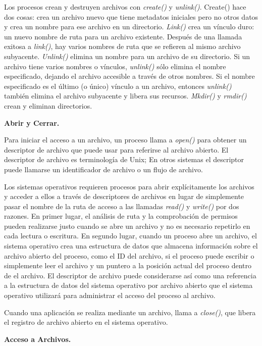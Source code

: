 \documentclass[10pt]{book}
\begin{document}
Los procesos crean y destruyen archivos con \textit{create()} y \textit{unlink()}. Create() hace dos cosas: crea un archivo nuevo que tiene metadatos iniciales pero no otros datos y crea un nombre para ese archivo en un directorio. \textit{Link()} crea un vínculo duro: un nuevo nombre de ruta para un archivo existente. Después de una llamada exitosa a \textit{link()}, hay varios nombres de ruta que se refieren al mismo archivo subyacente. \textit{Unlink()} elimina un nombre para un archivo de su directorio. Si un archivo tiene varios nombres o vínculos, \textit{unlink()} sólo elimina el nombre especificado, dejando el archivo accesible a través de otros nombres. Si el nombre especificado es el último (o único) vínculo a un archivo, entonces \textit{unlink()} también elimina el archivo subyacente y libera sus recursos. \textit{Mkdir()} y \textit{rmdir()} crean y eliminan directorios.

\textbf{Abrir y Cerrar.}

Para iniciar el acceso a un archivo, un proceso llama a \textit{open()} para obtener un descriptor de archivo que puede usar para referirse al archivo abierto. El descriptor de archivo es terminología de Unix; En otros sistemas el descriptor puede llamarse un identificador de archivo o un flujo de archivo.

Los sistemas operativos requieren procesos para abrir explícitamente los archivos y acceder a ellos a través de descriptores de archivos en lugar de simplemente pasar el nombre de la ruta de acceso a las llamadas \textit{read()} y \textit{write()} por dos razones. En primer lugar, el análisis de ruta y la comprobación de permisos pueden realizarse justo cuando se abre un archivo y no es necesario repetirlo en cada lectura o escritura. En segundo lugar, cuando un proceso abre un archivo, el sistema operativo crea una estructura de datos que almacena información sobre el archivo abierto del proceso, como el ID del archivo, si el proceso puede escribir o simplemente leer el archivo y un puntero a la posición actual del proceso dentro de el archivo. El descriptor de archivo puede considerarse así como una referencia a la estructura de datos del sistema operativo por archivo abierto que el sistema operativo utilizará para administrar el acceso del proceso al archivo.

Cuando una aplicación se realiza mediante un archivo, llama a \textit{close()}, que libera el registro de archivo abierto en el sistema operativo.

\textbf{Acceso a Archivos.}
\end{document}

